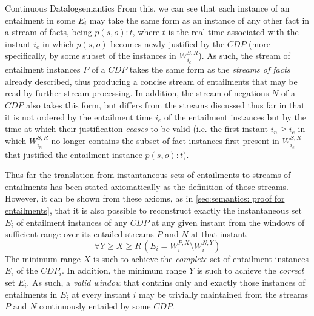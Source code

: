 \begin{nestedsection}{Continuous Datalog}{semantics}
	From this, we can see that each instance of an entailment in some $E_{i}$ may take the same form as an instance of any other fact in a stream of facts, being ${p(s,o):t}$, where $t$ is the real time associated with the instant $i_{e}$ in which ${p(s,o)}$ becomes newly justified by the ${CDP}$
	(more specifically, by some subset of the instances in $W^{S,R}_{i_{e}}$).
	As such, the stream of entailment instances $P$ of a ${CDP}$ takes the same form as the \emph{streams of facts} already described, thus producing a concise stream of entailments that may be read by further stream processing.
	In addition, the stream of negations $N$ of a ${CDP}$ also takes this form, but differs from the streams discussed thus far in that it is not ordered by the entailment time $i_{e}$ of the entailment instances but by the time at which their justification \emph{ceases} to be valid
	(i.e. the first instant ${i_{n} \geq i_{e}}$ in which $W^{S,R}_{i_{n}}$ no longer contains the subset of fact instances first present in $W^{S,R}_{i_{e}}$ that justified the entailment instance ${p(s,o):t}$).

	Thus far the translation from instantaneous sets of entailments to streams of entailments has been stated axiomatically as the definition of those streams.
	However, it can be shown from these axioms,
	as in \ref{sec:semantics: proof for entailments},
	that it is also possible to reconstruct exactly the instantaneous set $E_{i}$ of entailment instances of any ${CDP}$ at any given instant from the windows of sufficient range over its entailed streams $P$ and $N$ at that instant.
	\[ \forall Y \geq X \geq R \, \left( E_{i} = W^{P,X}_{i} \setminus W^{N,Y}_{i} \right) \]
	The minimum range $X$ is such to achieve the \emph{complete} set of entailment instances $E_{i}$ of the ${CDP}_{i}$.
	In addition, the minimum range $Y$ is such to achieve the \emph{correct} set $E_{i}$.
	As such, a \emph{valid window} that contains only and exactly those instances of entailments in $E_{i}$ at every instant $i$ may be trivially maintained from the streams $P$ and $N$ continuously entailed by some ${CDP}$.
\end{nestedsection}
